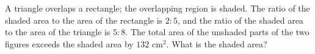 A triangle overlaps a rectangle; the overlapping region is shaded. The ratio of the shaded area to the area of the rectangle is $2:5$, and the ratio of the shaded area to the area of the triangle is $5:8$. The total area of the unshaded parts of the two figures exceeds the shaded area by $132$ cm$^2$. What is the shaded area?
